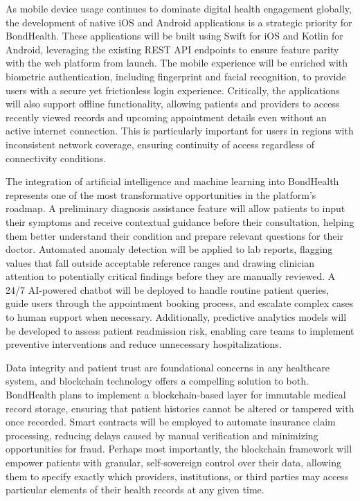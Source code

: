\noindent As mobile device usage continues to dominate digital health engagement globally, the development of native iOS and Android applications is a strategic priority for BondHealth. These applications will be built using Swift for iOS and Kotlin for Android, leveraging the existing REST API endpoints to ensure feature parity with the web platform from launch. The mobile experience will be enriched with biometric authentication, including fingerprint and facial recognition, to provide users with a secure yet frictionless login experience. Critically, the applications will also support offline functionality, allowing patients and providers to access recently viewed records and upcoming appointment details even without an active internet connection. This is particularly important for users in regions with inconsistent network coverage, ensuring continuity of access regardless of connectivity conditions.

\noindent The integration of artificial intelligence and machine learning into BondHealth represents one of the most transformative opportunities in the platform's roadmap. A preliminary diagnosis assistance feature will allow patients to input their symptoms and receive contextual guidance before their consultation, helping them better understand their condition and prepare relevant questions for their doctor. Automated anomaly detection will be applied to lab reports, flagging values that fall outside acceptable reference ranges and drawing clinician attention to potentially critical findings before they are manually reviewed. A 24/7 AI-powered chatbot will be deployed to handle routine patient queries, guide users through the appointment booking process, and escalate complex cases to human support when necessary. Additionally, predictive analytics models will be developed to assess patient readmission risk, enabling care teams to implement preventive interventions and reduce unnecessary hospitalizations.

\noindent Data integrity and patient trust are foundational concerns in any healthcare system, and blockchain technology offers a compelling solution to both. BondHealth plans to implement a blockchain-based layer for immutable medical record storage, ensuring that patient histories cannot be altered or tampered with once recorded. Smart contracts will be employed to automate insurance claim processing, reducing delays caused by manual verification and minimizing opportunities for fraud. Perhaps most importantly, the blockchain framework will empower patients with granular, self-sovereign control over their data, allowing them to specify exactly which providers, institutions, or third parties may access particular elements of their health records at any given time.

